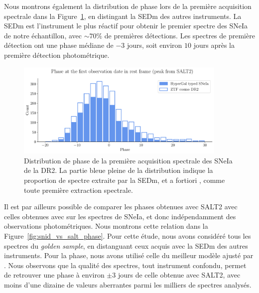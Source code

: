 \documentclass[../main/main.tex]{subfiles}
\begin{document}
Nous montrons également la distribution de phase lors de la première
acquisition spectrale dans la Figure~\ref{fig:phaseIa}, en distingant la
SEDm des autres instruments. La SEDm est l'instrument
le plus réactif pour obtenir le premier spectre des SNeIa de notre
échantillon, avec $\sim70\%$ de premières détections. Les spectres
de première détection ont une phase médiane de $-3$ jours, soit environ
$10$ jours après la première détection photométrique.

\begin{figure}[ht]
  \centering
  \includegraphics[width=0.9\textwidth]{../figures/09_dr2/phaseIadr2.pdf}
  \caption[Distribution de phase de la première acquisition spectrale
  des SNeIa de la DR2.]{Distribution de phase de la première acquisition spectrale
  des SNeIa de la DR2. La partie bleue pleine de la distribution indique
la proportion de spectre extraite par la SEDm, et a fortiori \hypergal,
comme toute première extraction spectrale.}
  \label{fig:phaseIa}
\end{figure}


Il est par ailleurs possible de comparer les phases obtenues avec SALT2
avec celles obtenues avec  sur les spectres de SNeIa, et donc
indépendamment des observations photométriques. Nous montrons cette
relation dans la Figure~\ref{fig:snid_vs_salt_phase}. Pour cette étude,
nous avons considéré tous les spectres du \textit{golden sample}, en
distanguant ceux acquis avec la SEDm des autres instruments. Pour la
phase, nous avons utilisé celle du meilleur modèle ajusté par
. Nous observons que la qualité des spectres, tout instrument
confondu, permet de retrouver une phase à environ $\pm3$ jours de celle
obtenue avec SALT2, avec moins d'une dizaine de valeurs aberrantes
parmi les milliers de spectres analysés.
\end{document}
